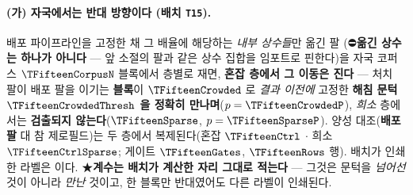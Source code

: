 \documentclass[11pt]{report}
\numberwithin{equation}{chapter}
\numberwithin{figure}{chapter}
\numberwithin{table}{chapter}
\begin{document}
\paragraph{(가) 자국에서는 반대 방향이다 (배치 \texttt{T15}).}
배포 파이프라인을 고정한 채 그 배율에 해당하는 \emph{내부 상수들}만 옮긴 팔
(⛔\textbf{옮긴 상수는 하나가 아니다} --- 앞 소절의 팔과 같은 상수 집합을 임포트로 핀한다)을 자국 코퍼스
$\TFifteenCorpusN$ 블록에서 층별로 재면, \textbf{혼잡 층에서 그 이동은 진다} --- 처치 팔이
배포 팔을 이기는 \textbf{블록}이 $\TFifteenCrowded$ 로 \emph{결과 이전에} 고정한
\textbf{해침 문턱 $\TFifteenCrowdedThresh$ 을 정확히 만나며}($p = \TFifteenCrowdedP$),
\emph{희소} 층에서는 \textbf{검출되지 않는다}($\TFifteenSparse$, $p = \TFifteenSparseP$).
양성 대조(\textbf{배포 팔} 대 참 제로필드)는 두 층에서 복제된다(혼잡 $\TFifteenCtrl$
$\cdot$ 희소 $\TFifteenCtrlSparse$; 게이트 $\TFifteenGates$, $\TFifteenRows$ 행).
배치가 인쇄한 라벨은 \texttt{\TFifteenLabel} 이다.
★\textbf{계수는 배치가 계산한 자리 그대로 적는다} --- 그것은 문턱을 \emph{넘어선} 것이
아니라 \emph{만난} 것이고, 한 블록만 반대였어도 다른 라벨이 인쇄된다.
\end{document}
